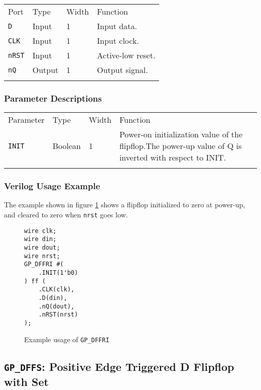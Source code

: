 \documentclass[11pt]{article}
\newcommand{\tokenstyle}[1]{\texttt{#1}}
\newcommand{\wirestyle}[1]{\texttt{#1}}
\newcommand{\whenstyle}[1]{{\fontseries{sb}\selectfont#1}}
\newcommand{\thinhline}{\Xhline{1\arrayrulewidth}}
\newcommand{\thickhline}{\Xhline{2.5\arrayrulewidth}}
\begin{document}
\begin{tabularx}{\textwidth}{lllX}
\thinhline
\whenstyle{Port} & \whenstyle{Type} & \whenstyle{Width} & \whenstyle{Function} \\
\thickhline
\tokenstyle{D} & Input & 1 & Input data. \\
\thinhline
\tokenstyle{CLK} & Input & 1 & Input clock. \\
\thinhline
\tokenstyle{nRST} & Input & 1 & Active-low reset. \\
\thinhline
\tokenstyle{nQ} & Output & 1 & Output signal. \\
\thinhline
\end{tabularx}

\subsubsection{Parameter Descriptions}

\begin{tabularx}{\textwidth}{lllX}
\thinhline
\whenstyle{Parameter} & \whenstyle{Type} & \whenstyle{Width} & \whenstyle{Function} \\
\thickhline
\tokenstyle{INIT} & Boolean & 1 & Power-on initialization value of the flipflop.\newline The power-up value of Q is inverted
with respect to INIT.\\
\thinhline
\end{tabularx}

\subsubsection{Verilog Usage Example}

The example shown in figure \ref{gp-dffri-example} shows a flipflop initialized to zero at power-up, and cleared to zero
when \wirestyle{nrst} goes low.

\begin{figure}[h]
\begin{lstlisting}
wire clk;
wire din;
wire dout;
wire nrst;
GP_DFFRI #(
	.INIT(1'b0)
) ff (
	.CLK(clk),
	.D(din),
	.nQ(dout),
	.nRST(nrst)
);
\end{lstlisting}
\caption{Example usage of \tokenstyle{GP\_DFFRI}}
\label{gp-dffri-example}
\end{figure}


\pagebreak
\subsection{\tokenstyle{GP\_DFFS}: Positive Edge Triggered D Flipflop with Set}
\label{gp-dffs}
\end{document}
